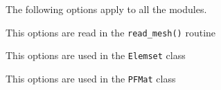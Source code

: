 
The following options apply to all the modules. 


This options are read in the \verb+read_mesh()+ routine

\begin{itemize}

\end{itemize}


This options are used in the \verb+Elemset+ class

\begin{itemize}

\end{itemize}


This options are used in the \verb+PFMat+ class

\begin{itemize}

\end{itemize}

